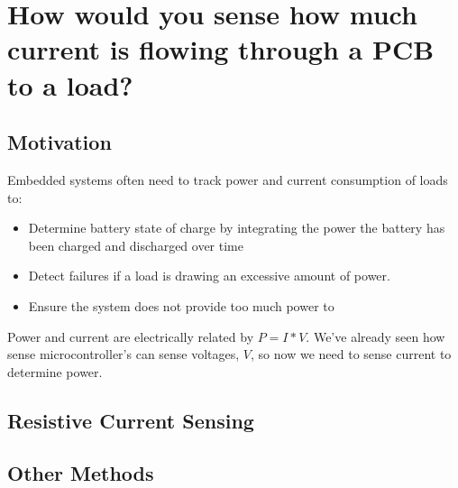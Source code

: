 \documentclass[main.tex]{subfiles}
\begin{document}
\section{How would you sense how much current is flowing through a PCB to a load?}

\subsection{Motivation}
Embedded systems often need to track power and current consumption of loads to:
\begin{itemize}
    \item Determine battery state of charge by integrating the power the battery has been charged and discharged over time
    \item Detect failures if a load is drawing an excessive amount of power. 
    \item Ensure the system does not provide too much power to
\end{itemize}
Power and current are electrically related by $P = I * V$. We've already seen how sense microcontroller's can sense voltages, $V$, so now we need to sense current to determine power. 

\subsection{Resistive Current Sensing}

\subsection{Other Methods}
\end{document}
